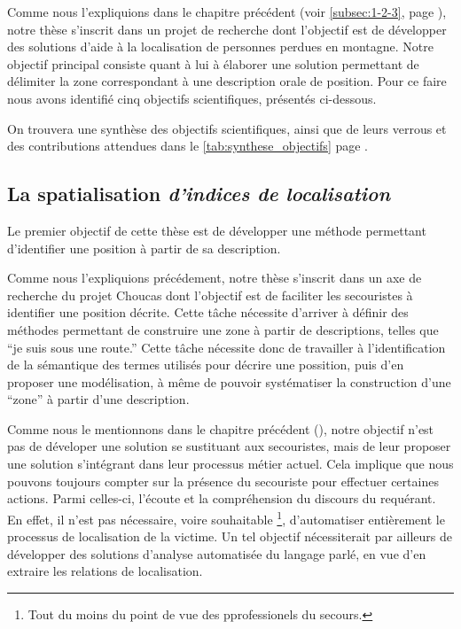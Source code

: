 Comme nous l'expliquions dans le chapitre précédent (voir
\ref{subsec:1-2-3}, page \pageref{subsec:1-2-3}), notre thèse
s'inscrit dans un projet de recherche dont l'objectif est de
développer des solutions d'aide à la localisation de personnes perdues
en montagne. Notre objectif principal consiste quant à lui à élaborer
une solution permettant de délimiter la zone correspondant à une
description orale de position. Pour ce faire nous avons identifié cinq
objectifs scientifiques, présentés ci-dessous.

On trouvera une synthèse des objectifs scientifiques, ainsi que de
leurs verrous et des contributions attendues dans le
\autoref{tab:synthese_objectifs} page
\pageref{tab:synthese_objectifs}.

\subsection{La spatialisation \emph{d'indices de localisation}}
\label{subsec:2-1-1}

Le premier objectif de cette thèse est de développer une méthode
permettant d'identifier une position à partir de sa
description.

Comme nous l'expliquions précédement, notre thèse s'inscrit dans un
axe de recherche du projet Choucas dont l'objectif est de faciliter
les secouristes à identifier une position décrite.
%
Cette tâche nécessite d'arriver à définir des méthodes permettant de
construire une zone à partir de descriptions, telles que \enquote{je
  suis sous une route.} Cette tâche nécessite donc de travailler à
l'identification de la sémantique des termes utilisés pour décrire une
possition, puis d'en proposer une modélisation, à même de pouvoir
systématiser la construction d'une \enquote{zone} à partir d'une
description.

Comme nous le mentionnons dans le chapitre précédent (), notre
objectif n'est pas de déveloper une solution se sustituant aux
secouristes, mais de leur proposer une solution s'intégrant dans leur
processus métier actuel. Cela implique que nous pouvons toujours
compter sur la présence du secouriste pour effectuer certaines
actions. Parmi celles-ci, l'écoute et la compréhension du discours du
requérant. En effet, il n'est pas nécessaire, voire souhaitable
\footnote{Tout du moins du point de vue des pprofessionels du
  secours.}, d'automatiser entièrement le processus de localisation de
la victime. Un tel objectif nécessiterait par ailleurs de développer
des solutions d'analyse automatisée du langage parlé, en vue d'en
extraire les relations de localisation.

